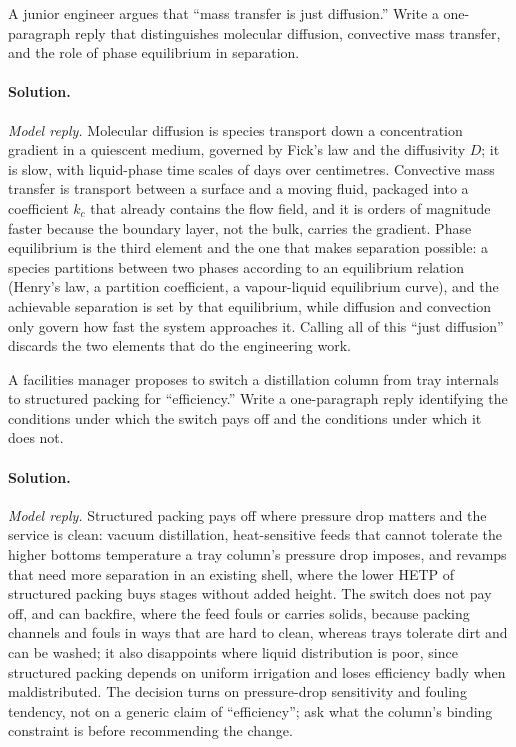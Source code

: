 \begin{exercise}
A junior engineer argues that ``mass transfer is just diffusion.''
Write a one-paragraph reply that distinguishes molecular diffusion,
convective mass transfer, and the role of phase equilibrium in
separation.

\paragraph{Solution.}
\textit{Model reply.} Molecular diffusion is species transport down a
concentration gradient in a quiescent medium, governed by Fick's law
and the diffusivity $D$; it is slow, with liquid-phase time scales of
days over centimetres. Convective mass transfer is transport between a
surface and a moving fluid, packaged into a coefficient $k_c$ that
already contains the flow field, and it is orders of magnitude faster
because the boundary layer, not the bulk, carries the gradient. Phase
equilibrium is the third element and the one that makes separation
possible: a species partitions between two phases according to an
equilibrium relation (Henry's law, a partition coefficient, a
vapour-liquid equilibrium curve), and the achievable separation is set
by that equilibrium, while diffusion and convection only govern how
fast the system approaches it. Calling all of this ``just diffusion''
discards the two elements that do the engineering work.
\end{exercise}

\begin{exercise}
A facilities manager proposes to switch a distillation column from
tray internals to structured packing for ``efficiency.'' Write a
one-paragraph reply identifying the conditions under which the switch
pays off and the conditions under which it does not.

\paragraph{Solution.}
\textit{Model reply.} Structured packing pays off where pressure drop
matters and the service is clean: vacuum distillation, heat-sensitive
feeds that cannot tolerate the higher bottoms temperature a tray
column's pressure drop imposes, and revamps that need more separation in
an existing shell, where the lower HETP of structured packing buys
stages without added height. The switch does not pay off, and can
backfire, where the feed fouls or carries solids, because packing
channels and fouls in ways that are hard to clean, whereas trays
tolerate dirt and can be washed; it also disappoints where liquid
distribution is poor, since structured packing depends on uniform
irrigation and loses efficiency badly when maldistributed. The decision
turns on pressure-drop sensitivity and fouling tendency, not on a
generic claim of ``efficiency''; ask what the column's binding
constraint is before recommending the change.
\end{exercise}
